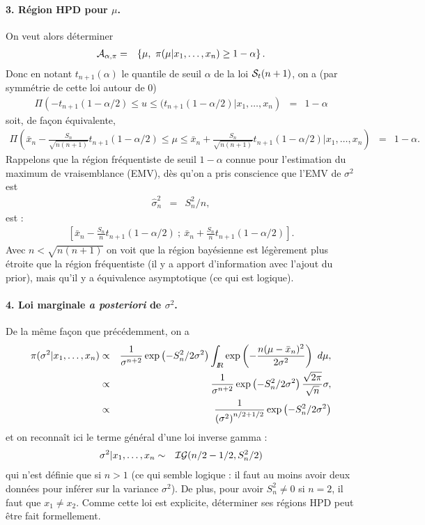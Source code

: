 \paragraph{3. Région HPD pour $\mu$.}
On veut alors déterminer 
\begin{eqnarray*}
{\cal{A}}_{\alpha,\pi} & = & \left\{\mu, \ \pi(\mu|x_1,\ldots,x_n ) \geq 1-\alpha\right\}.
\end{eqnarray*}
Donc en notant $t_{n+1}(\alpha)$ le quantile de seuil $\alpha$ de la loi ${\cal{S}}_t(n+1)$, on a (par symmétrie de cette loi autour de 0)
\begin{eqnarray*}
\Pi\left(-t_{n+1}(1-\alpha/2) \leq u \leq (t_{n+1}(1-\alpha/2)|x_1,\ldots,x_n\right) & = & 1-\alpha
\end{eqnarray*}
soit, de fa\c con équivalente,
\begin{eqnarray*}
\Pi\left(\bar{x}_n-\frac{S_n}{\sqrt{n(n+1)}}t_{n+1}(1-\alpha/2) \leq \mu \leq \bar{x}_n+\frac{S_n}{\sqrt{n(n+1)}}t_{n+1}(1-\alpha/2)|x_1,\ldots,x_n\right) & = & 1-\alpha.
\end{eqnarray*}
Rappelons que la région fréquentiste de seuil $1-\alpha$ connue pour l'estimation du maximum de vraisemblance (EMV), dès qu'on a pris conscience que l'EMV de $\sigma^2$ est
\begin{eqnarray*}
\hat{\sigma}^2_n & = & S^2_n/n,
\end{eqnarray*}
est :
\begin{eqnarray*}
\left[\bar{x}_n-\frac{S_n}{n}t_{n+1}(1-\alpha/2) \ ; \ \bar{x}_n+\frac{S_n}{n}t_{n+1}(1-\alpha/2)\right].
\end{eqnarray*}
Avec $n<\sqrt{n(n+1)}$ on voit que la région bayésienne est légèrement plus étroite que la région fréquentiste (il y a apport d'information avec l'ajout du prior), mais qu'il y a équivalence asymptotique (ce qui est logique). 


\paragraph{4. Loi marginale {\it a posteriori} de $\sigma^2$.} De la même fa\c con que précédemment, on a 
\begin{eqnarray*}
\pi(\sigma^2|x_1,\ldots,x_n) & \propto & \frac{1}{\sigma^{n+2}}   \exp\left(-S^2_n/2\sigma^2\right) \int_{I\!\!R} \exp\left(-\frac{n(\mu-\bar{x}_n)^2}{2\sigma^2}\right) \ d\mu, \\
 & \propto & \frac{1}{\sigma^{n+2}}   \exp\left(-S^2_n/2\sigma^2\right) \frac{\sqrt{2\pi}}{\sqrt{n}}\sigma, \\
 & \propto &  \frac{1}{\left(\sigma^2\right)^{n/2+1/2}} \exp\left(-S^2_n/2\sigma^2\right)
\end{eqnarray*}
et on reconnaît ici le terme général d'une loi inverse gamma :
\begin{eqnarray*}
\sigma^2|x_1,\ldots,x_n  & \sim & {\cal{IG}}(n/2-1/2,S^2_n/2)
\end{eqnarray*}
qui n'est définie que si $n>1$ (ce qui semble logique : il faut au moins avoir deux données pour inférer sur la variance $\sigma^2$). De plus, pour avoir $S^2_n\neq 0$ si $n=2$, il faut que $x_1\neq x_2$. Comme cette loi est explicite, déterminer ses régions HPD peut être fait formellement. 


